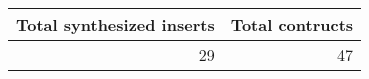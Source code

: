 \begin{table}[H]
\centering
\caption{}
\label{table:3}
\begin{tabular}{rr}
\toprule
 Total synthesized inserts &  Total contructs \\
\midrule
                        29 &               47 \\
\bottomrule
\end{tabular}
\end{table}
